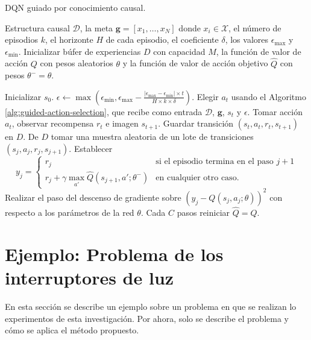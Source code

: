 \begin{mialgoritmo}[H]
  	\caption{DQN guiado por conocimiento causal.}
	\label{alg:dqn-algo-causal}
  \begin{algorithmic}[1]
  \REQUIRE Estructura causal $\mathcal{D}$, la meta $\mathbf{g} = [x_1, \dots, x_N]$ donde $x_i \in \mathcal{X}$, el número de episodios $k$, el horizonte $H$ de cada episodio, el coeficiente $\delta$, los valores $\epsilon_{\max}$ y $\epsilon_{\min}$.
  \STATE Inicializar búfer de experiencias $D$ con capacidad $M$, la función de valor de acción $Q$ con pesos aleatorios $\theta$ y la función de valor de acción objetivo $\hat{Q}$ con pesos $\theta^- = \theta$.
  
    \STATE Inicializar $s_0$.
    \STATE $\epsilon \leftarrow \max(\epsilon_{\min}, \epsilon_{\max} - \frac{|\epsilon_{\max} - \epsilon_{\min}| \times t}{H \times k \times \delta})$.
    \STATE Elegir $a_t$ usando el Algoritmo \ref{alg:guided-action-selection}, que recibe como entrada $\mathcal{D}$, $\mathbf{g}$, $s_t$ y $\epsilon$.
    \STATE Tomar acción $a_t$, observar recompensa $r_{t}$ e imagen $s_{t+1}$.
    \STATE Guardar transición $(s_t, a_t, r_t, s_{t+1})$ en $D$.
    \STATE De $D$ tomar una muestra aleatoria de un lote de transiciones $(s_j, a_j, r_j, s_{j+1})$.
    \STATE Establecer
	\[
	 y_j = 
   \begin{cases} 
      r_j  & \mbox{si el episodio termina en el paso } j + 1 \\
      r_j + \gamma \max_{a'}\hat{Q}(s_{j+1}, a'; \theta^-) & \mbox{en cualquier otro caso.}
   \end{cases}
	\]
	\STATE Realizar el paso del
	descenso de gradiente sobre $(y_j -  Q(s_j,a_j;\theta))^2$ con respecto a los parámetros de la red $\theta$.
	\STATE Cada $C$ pasos reiniciar $\hat{Q} = Q$.
    \ENDFOR
  \ENDFOR
  \end{algorithmic}
\end{mialgoritmo}


\section{Ejemplo: Problema de los interruptores de luz}\label{section:switches-example}

En esta sección se describe un ejemplo sobre un problema en que se realizan 
lo experimentos de esta investigación. Por ahora, solo se describe el problema
y cómo se aplica el método propuesto.

